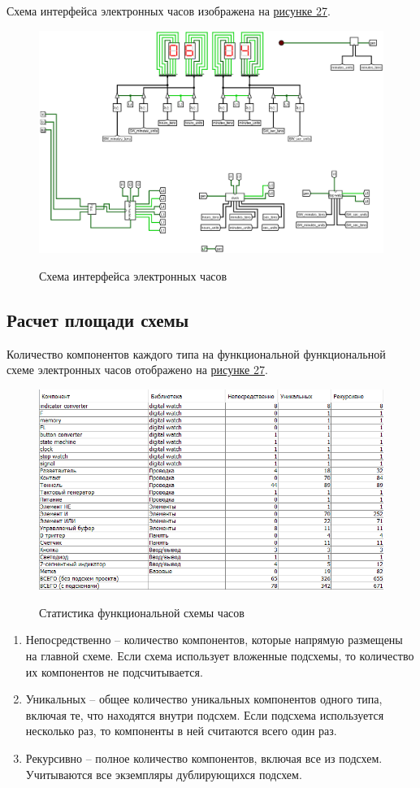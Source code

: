\documentclass[10pt,a4paper,final]{article} %
\begin{document}
Схема интерфейса электронных часов изображена на \hyperref[main]{рисунке 27}.
\newpage
\begin{figure}[htpb]
	\centering
	\includegraphics[scale=0.35]{logisim/img/main.png}
	\label{main} 
	\caption{Схема интерфейса электронных часов}
\end{figure}


\subsection{Расчет площади схемы}
Количество компонентов каждого типа на функциональной функциональной схеме электронных часов отображено на \hyperref[statistic]{рисунке 27}.
\newpage
\begin{figure}[htpb]
	\centering
	\includegraphics[scale=1]{logisim/img/statistic.png}
	\label{statistic} 
	\caption{Статистика функциональной схемы часов}
\end{figure}

\begin{enumerate}[label=]
	\item Непосредственно -- количество компонентов, которые напрямую размещены на главной схеме. Если схема использует вложенные подсхемы, то количество их компонентов не подсчитывается.
	\item Уникальных -- общее количество уникальных компонентов одного типа, включая те, что находятся внутри подсхем. Если подсхема используется несколько раз, то компоненты в ней считаются всего один раз.
	\item Рекурсивно -- полное количество компонентов, включая все из подсхем. Учитываются все экземпляры дублирующихся подсхем.
\end{enumerate}
\end{document}
